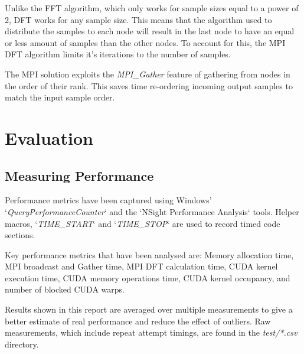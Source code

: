 \documentclass[11pt,a4paper]{article}
\begin{document}
\begin{figure}[H]%
    \centering
    \qquad
    \vspace{5pt}
    \caption{}%
    \label{fig:mpi_code}%
\end{figure}

Unlike the FFT algorithm, which only works for sample sizes equal to a power of 2, DFT works for any sample size. This means that the algorithm used to distribute the samples to each node will result in the last node to have an equal or less amount of samples than the other nodes. To account for this, the MPI DFT algorithm limits it's iterations to the number of samples. 

The MPI solution exploits the \textit{MPI\_Gather} feature of gathering from nodes in the order of their rank. This saves time re-ordering incoming output samples to match the input sample order.


\section{Evaluation}
\subsection{Measuring Performance}
Performance metrics have been captured using Windows' `\textit{QueryPerformanceCounter}` and the `NSight Performance Analysis` tools. Helper macros, `\textit{TIME\_START}` and `\textit{TIME\_STOP}` are used to record timed code sections.

Key performance metrics that have been analysed are: Memory allocation time, MPI broadcast and Gather time, MPI DFT calculation time, CUDA kernel execution time, CUDA memory operations time, CUDA kernel occupancy, and number of blocked CUDA warps.

Results shown in this report are averaged over multiple measurements to give a better estimate of real performance and reduce the effect of outliers. Raw measurements, which include repeat attempt timings, are found in the \textit{test/*.csv} directory.
\end{document}
